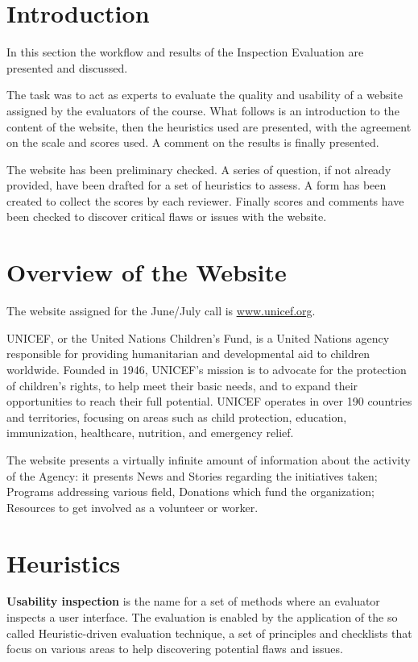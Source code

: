 \section{Introduction}
In this section the workflow and results of the Inspection Evaluation are presented and discussed.

The task was to act as experts to evaluate the quality and usability of a website assigned by the evaluators of the course. What follows is an introduction to the content of the website, then the heuristics used are presented, with the agreement on the scale and scores used. A comment on the results is finally presented.

The website has been preliminary checked. A series of question, if not already provided, have been drafted for a set of heuristics to assess. A form has been created to collect the scores by each reviewer. Finally scores and comments have been checked to discover critical flaws or issues with the website.

\section{Overview of the Website}
The website assigned for the June/July call is \underline{\url{www.unicef.org}}.

UNICEF, or the United Nations Children’s Fund, is a United Nations agency responsible for providing humanitarian and developmental aid to children worldwide. Founded in 1946, UNICEF’s mission is to advocate for the protection of children’s rights, to help meet their basic needs, and to expand their opportunities to reach their full potential. UNICEF operates in over 190 countries and territories, focusing on areas such as child protection, education, immunization, healthcare, nutrition, and emergency relief.

The website presents a virtually infinite amount of information about the activity of the Agency: it presents News and Stories regarding the initiatives taken; Programs addressing various field, Donations which fund the organization; Resources to get involved as a volunteer or worker.

\section{Heuristics}
\textbf{Usability inspection} is the name for a set of methods where an evaluator inspects a user interface.
The evaluation is enabled by the application of the so called Heuristic-driven evaluation technique, a set of principles and checklists that focus on various areas to help discovering potential flaws and issues.


